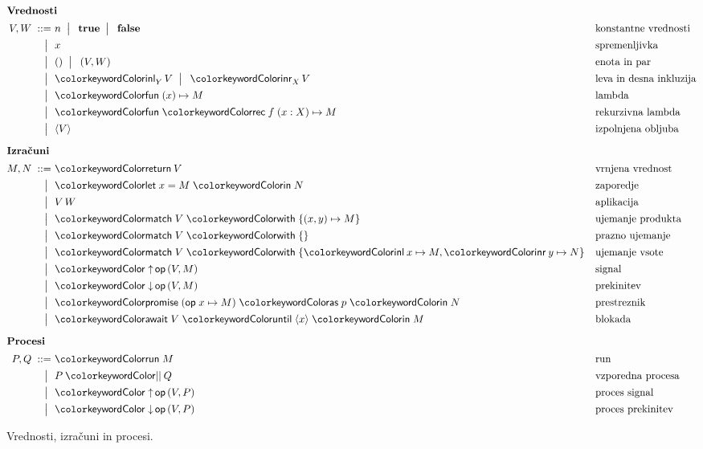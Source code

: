 \begin{figure}[H]
	\parbox{\textwidth}{
		\centering
		\small
		\begin{align*}
		\intertext{\textbf{Vrednosti}}
		V, W
		\bnfis& n \bnfor\! \true \bnfor\! \false        & &\text{konstantne vrednosti} \\
		\bnfor& x                                       & &\text{spremenljivka} \\
		\bnfor& \tmunit \bnfor\! \tmpair{V}{W}          & &\text{enota in par} \\
		\bnfor& \tminl[Y]{V} \bnfor\! \tminr[X]{V}      & &\text{leva in desna inkluzija} \\
		\bnfor& \tmfun{x}{M}                        & &\text{lambda} \\
		\bnfor& \tmfunrec{f}{x : X}{M}                        & &\text{rekurzivna lambda} \\
		\bnfor& \tmpromise V                            & &\text{izpolnjena obljuba}
		\\[1ex]
		\intertext{\textbf{Izračuni}}
		M, N
		\bnfis& \tmreturn{V}                            & &\text{vrnjena vrednost} \\
		\bnfor& \tmlet{x}{M}{N}                         & &\text{zaporedje} \\
		\bnfor& V\,W                                    & &\text{aplikacija} \\
		\bnfor& \tmmatch{V}{\tmpair{x}{y} \mapsto M}    & &\text{ujemanje produkta} \\
		\bnfor& \tmmatch[]{V}{}                        & &\text{prazno ujemanje} \\
		\bnfor& \tmmatch{V}{\tminl{x} \mapsto M, \tminr{y} \mapsto N}	& &\text{ujemanje vsote} \\
		\bnfor& \tmopout{op}{V}{M}       & &\text{signal} \\
		\bnfor& \tmopin{op}{V}{M}          & &\text{prekinitev} \\
		\bnfor& \tmwith{op}{x}{M}{p}{N}      & &\text{prestreznik} \\
		\bnfor& \tmawait{V}{x}{M}             & &\text{blokada}
			\\[1ex]
		\intertext{\textbf{Procesi}}
		  P, Q
		\bnfis & \tmrun M & & \text{run} \\
		\bnfor & \tmpar P Q & & \text{vzporedna procesa} \\
		\bnfor & \tmopout{op}{V}{P} & & \text{proces signal} \\
		\bnfor & \tmopin{op}{V}{P} & & \text{proces prekinitev}
		\end{align*}
	} 
	\caption{Vrednosti, izračuni in procesi.}
	\label{fig:izrazi}
\end{figure}


